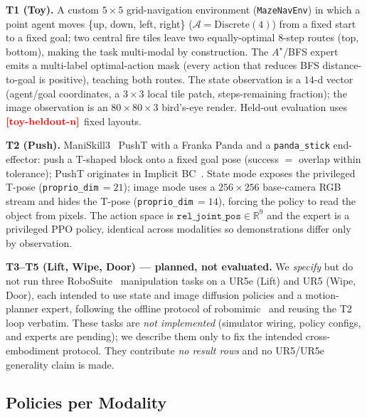 \documentclass[letterpaper]{article} %
\newcommand{\PH}[1]{{\color{red}\textbf{[#1]}}}
\begin{document}
\textbf{T1 (Toy).} A custom $5{\times}5$ grid-navigation environment
(\texttt{MazeNavEnv}) in which a point agent moves \{up, down, left, right\}
($\mathcal{A}=\mathrm{Discrete}(4)$) from a fixed start to a fixed goal; two central
fire tiles leave two equally-optimal $8$-step routes (top, bottom), making the task
multi-modal by construction. The $A^{\!\star}$/BFS expert emits a multi-label
optimal-action mask (every action that reduces BFS distance-to-goal is positive),
teaching both routes. The state observation is a $14$-d vector (agent/goal
coordinates, a $3{\times}3$ local tile patch, steps-remaining fraction); the image
observation is an $80{\times}80{\times}3$ bird's-eye render. Held-out evaluation uses
$\PH{toy-heldout-n}$ fixed layouts.

\textbf{T2 (Push).} ManiSkill3~\cite{tao2024maniskill3,mu2021maniskill} PushT with a
Franka Panda and a \texttt{panda\_stick} end-effector: push a T-shaped block onto a
fixed goal pose (success $=$ overlap within tolerance); PushT originates in Implicit
BC~\cite{florence2021implicitbc}. State mode exposes the privileged T-pose
(\texttt{proprio\_dim}\,$=21$); image mode uses a $256{\times}256$ base-camera RGB
stream and hides the T-pose (\texttt{proprio\_dim}\,$=14$), forcing the policy to read
the object from pixels. The action space is
$\texttt{rel\_joint\_pos}\in\mathbb{R}^{9}$ and the expert is a privileged PPO policy,
identical across modalities so demonstrations differ only by observation.

\textbf{T3--T5 (Lift, Wipe, Door) --- planned, not evaluated.}
We \emph{specify} but do not run three RoboSuite~\cite{zhu2020robosuite}
manipulation tasks on a UR5e (Lift) and UR5 (Wipe, Door), each intended to use state
and image diffusion policies and a motion-planner expert, following the offline
protocol of robomimic~\cite{mandlekar2021robomimic} and reusing the T2 loop verbatim.
These tasks are \emph{not implemented} (simulator wiring, policy configs, and experts
are pending); we describe them only to fix the intended cross-embodiment protocol.
They contribute \emph{no result rows} and no UR5/UR5e generality claim is made.

\subsection{Policies per Modality}
\end{document}
